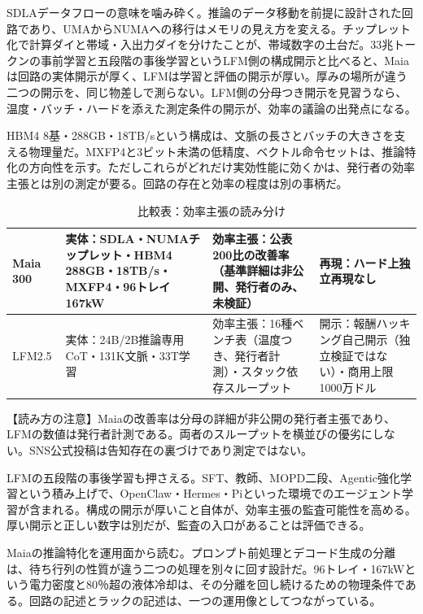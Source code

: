 \documentclass[lualatex,a4paper,10pt]{jlreq}
\begin{document}
SDLAデータフローの意味を噛み砕く。推論のデータ移動を前提に設計された回路であり、UMAからNUMAへの移行はメモリの見え方を変える。チップレット化で計算ダイと帯域・入出力ダイを分けたことが、帯域数字の土台だ。33兆トークンの事前学習と五段階の事後学習というLFM側の構成開示と比べると、Maiaは回路の実体開示が厚く、LFMは学習と評価の開示が厚い。厚みの場所が違う二つの開示を、同じ物差しで測らない。LFM側の分母つき開示を見習うなら、温度・バッチ・ハードを添えた測定条件の開示が、効率の議論の出発点になる。
\cite{B09,B11,B12,B10}


HBM4 8基・288GB・18TB/sという構成は、文脈の長さとバッチの大きさを支える物理量だ。MXFP4と3ビット未満の低精度、ベクトル命令セットは、推論特化の方向性を示す。ただしこれらがどれだけ実効性能に効くかは、発行者の効率主張とは別の測定が要る。回路の存在と効率の程度は別の事柄だ。
\cite{B09,B10}


\begin{table}[htbp]\centering\footnotesize
\caption{比較表：効率主張の読み分け}
\begin{tabularx}{0.96\linewidth}{@{}lXXX@{}}
\toprule
Maia 300 & 実体：SDLA・NUMAチップレット・HBM4 288GB・18TB/s・MXFP4・96トレイ167kW & 効率主張：公表200比の改善率（基準詳細は非公開、発行者のみ、未検証） & 再現：ハード上独立再現なし \\
\midrule
LFM2.5 & 実体：24B/2B推論専用CoT・131K文脈・33T学習 & 効率主張：16種ベンチ表（温度つき、発行者計測）・スタック依存スループット & 開示：報酬ハッキング自己開示（独立検証ではない）・商用上限1000万ドル \\
\bottomrule
\end{tabularx}
\end{table}
\cite{B09,B11,B12,B10}


\begin{tcolorbox}[colback=SurveySoft,colframe=SurveyRule,arc=1mm,boxrule=0.4pt,left=2mm,right=2mm]
【読み方の注意】Maiaの改善率は分母の詳細が非公開の発行者主張であり、LFMの数値は発行者計測である。両者のスループットを横並びの優劣にしない。SNS公式投稿は告知存在の裏づけであり測定ではない。
\end{tcolorbox}
\cite{B09,B11,B12,B10}


LFMの五段階の事後学習も押さえる。SFT、教師、MOPD二段、Agentic強化学習という積み上げで、OpenClaw・Hermes・Piといった環境でのエージェント学習が含まれる。構成の開示が厚いこと自体が、効率主張の監査可能性を高める。厚い開示と正しい数字は別だが、監査の入口があることは評価できる。
\cite{B11,B12}


Maiaの推論特化を運用面から読む。プロンプト前処理とデコード生成の分離は、待ち行列の性質が違う二つの処理を別々に回す設計だ。96トレイ・167kWという電力密度と80％超の液体冷却は、その分離を回し続けるための物理条件である。回路の記述とラックの記述は、一つの運用像としてつながっている。
\cite{B09,B10}
\end{document}
